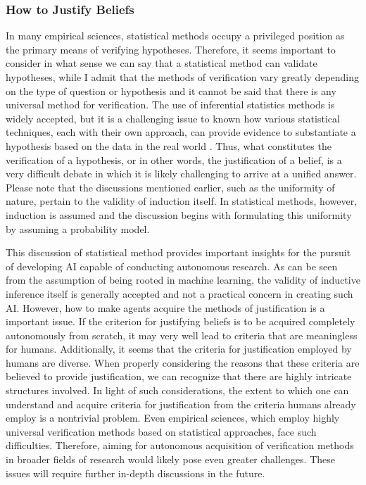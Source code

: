 \documentclass{book}
\begin{document}
\subsubsection{How to Justify Beliefs}
In many empirical sciences, statistical methods occupy a privileged position as the primary means of verifying hypotheses. Therefore, it seems important to consider in what sense we can say that a statistical method can validate hypotheses, while I admit that the methods of verification vary greatly depending on the type of question or hypothesis and it cannot be said that there is any universal method for verification. The use of inferential statistics methods is widely accepted, but it is a challenging issue to known how various statistical techniques, each with their own approach, can provide evidence to substantiate a hypothesis based on the data in the real world \cite{otsuka2022thinking,sober2008evidence,sep-statistics}. Thus, what constitutes the verification of a hypothesis, or in other words, the justification of a belief, is a very difficult debate in which it is likely challenging to arrive at a unified answer. Please note that the discussions mentioned earlier, such as the uniformity of nature, pertain to the validity of induction itself. In statistical methods, however, induction is assumed and the discussion begins with formulating this uniformity by assuming a probability model. 


This discussion of statistical method provides important insights for the pursuit of developing AI capable of conducting autonomous research. As can be seen from the assumption of being rooted in machine learning, the validity of inductive inference itself is generally accepted and not a practical concern in creating such AI. However, how to make agents acquire the methods of justification is a important issue. If the criterion for justifying beliefs is to be acquired completely autonomously from scratch, it may very well lead to criteria that are meaningless for humans. Additionally, it seems that the criteria for justification employed by humans are diverse. When properly considering the reasons that these criteria are believed to provide justification, we can recognize that there are highly intricate structures involved. In light of such considerations, the extent to which one can understand and acquire criteria for justification from the criteria humans already employ is a nontrivial problem. Even empirical sciences, which employ highly universal verification methods based on statistical approaches, face such difficulties. Therefore, aiming for autonomous acquisition of verification methods in broader fields of research would likely pose even greater challenges. These issues will require further in-depth discussions in the future.
\end{document}
